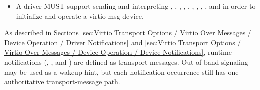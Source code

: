 \begin{itemize}
  \item A driver MUST support sending and interpreting
        , ,
        , ,
        , ,
        , ,
        , and  in order to
        initialize and operate a virtio-msg device.
\end{itemize}

As described in Sections
\ref{sec:Virtio Transport Options / Virtio Over Messages / Device Operation / Driver Notifications}
and
\ref{sec:Virtio Transport Options / Virtio Over Messages / Device Operation / Device Notifications},
runtime notifications (, , and
) are defined as transport messages. Out-of-band signaling
may be used as a wakeup hint, but each notification occurrence still has one
authoritative transport-message path.

